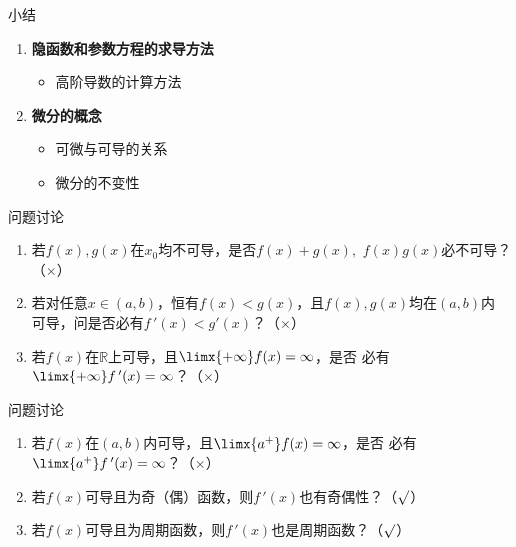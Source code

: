 \begin{frame}[<+->]{小结}
	\linespread{2}
	\begin{enumerate}
	  \item {\bf 隐函数和参数方程的求导方法}
	  \begin{itemize}
	    \item 高阶导数的计算方法
	  \end{itemize}
	  \item {\bf 微分的概念}
	  \begin{itemize}
	    \item 可微与可导的关系
	    \item 微分的不变性
	  \end{itemize}
	\end{enumerate}
\end{frame}

\begin{frame}{问题讨论}
	\linespread{1.5}
	\begin{enumerate}\pause 
	  \item 若$f(x),g(x)$在$x_0$均不可导，是否$f(x)+g(x),$ $f(x)g(x)$必不可导？\pause
	  （\alert{$\times$}）\pause 
	  \item 若对任意$x\in (a,b)$，恒有$f(x)<g(x)$，且$f(x),g(x)$均在$(a,b)$内
	  可导，问是否必有$f\,'(x)<g'(x)$？\pause （\alert{$\times$}）\pause 
	  \item 若$f(x)$在$\mathbb{R}$上可导，且$\limx{+\infty}f(x)=\infty$，是否
	  必有$\limx{+\infty}f\,'(x)=\infty$？\pause （\alert{$\times$}）
	\end{enumerate}
\end{frame}

\begin{frame}{问题讨论}
	\linespread{1.5}\pause 
	\begin{enumerate}
	  \addtocounter{enumi}{3}
	  \item 若$f(x)$在$(a,b)$内可导，且$\limx{a^+}f(x)=\infty$，是否
	  必有$\limx{a^+}f\,'(x)=\infty$？\pause （\alert{$\times$}）\pause 
	  \item 若$f(x)$可导且为奇（偶）函数，则$f\,'(x)$也有奇偶性？\pause （\alert{$\surd$}）\pause 
	  \item 若$f(x)$可导且为周期函数，则$f\,'(x)$也是周期函数？\pause （\alert{$\surd$}）
	\end{enumerate}
\end{frame}


